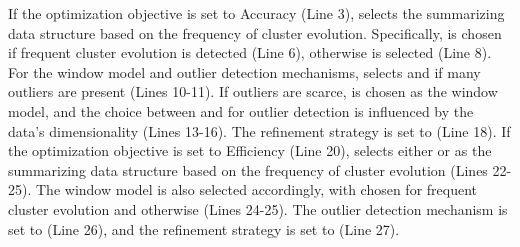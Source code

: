 If the optimization objective is set to Accuracy (Line 3), \algo selects the summarizing data structure based on the frequency of cluster evolution. Specifically, \MCs is chosen if frequent cluster evolution is detected (Line 6), otherwise \CFT is selected (Line 8). For the window model and outlier detection mechanisms, \algo selects \landmark and \buffertimer if many outliers are present (Lines 10-11). If outliers are scarce, \damped is chosen as the window model, and the choice between \buffer and \buffertimer for outlier detection is influenced by the data's dimensionality (Lines 13-16). The refinement strategy is set to \incrementalRefinement (Line 18). If the optimization objective is set to Efficiency (Line 20), \algo selects either \DPT or \Grids as the summarizing data structure based on the frequency of cluster evolution (Lines 22-25). The window model is also selected accordingly, with \landmark chosen for frequent cluster evolution and \sliding otherwise (Lines 24-25). The outlier detection mechanism is set to \nod (Line 26), and the refinement strategy is set to \norefinement (Line 27).

 
\begin{algorithm}[t]
\scriptsize
\caption{Flexible-migration Fun. of \algo.}
\label{alg:flexible_migration}
\end{algorithm}
